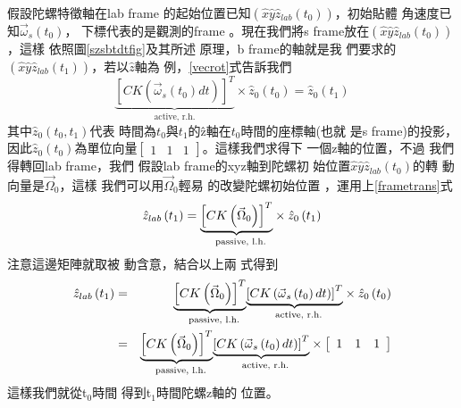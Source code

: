 \documentclass[12pt,a4paper]{article}
\begin{document}
假設陀螺特徵軸在lab frame%
的起始位置已知$\left( \hat{x}\hat{y%
}\hat{z}_{lab}(t_{0})\right) $，初始貼體%
角速度已知$\vec{\omega}_{s}(t_{0})$，%
下標代表的是觀測的frame%
。現在我們將s frame放在$%
\left( \hat{x}\hat{y}\hat{z}_{lab}(t_{0})\right) $，這樣%
依照圖\ref{szsbtdtfig}及其所述%
原理，b frame的軸就是我%
們要求的$\left( \hat{x}\hat{y}\hat{z}%
_{lab}(t_{1})\right) $，若以$\hat{z}$軸為%
例，\ref{vecrot}式告訴我們%
\begin{equation*}
\underset{\text{active, r.h.}}{\underbrace{\left[ CK\left( \vec{\omega}%
_{s}\left( t_{0}\right) dt\right) \right] ^{T}}}\times \hat{z}_{0}\left(
t_{0}\right) =\hat{z}_{0}\left( t_{1}\right) 
\end{equation*}%
其中$\hat{z}_{0}\left( t_{0},t_{1}\right) $代表%
時間為$t_{0}$與$t_{1}$的\^{z}軸在$%
t_{0}$時間的座標軸(也就%
是s frame)的投影，因此$\hat{z}%
_{0}\left( t_{0}\right) $為單位向量$\left[ 
\begin{array}{ccc}
1 & 1 & 1%
\end{array}%
\right] $。這樣我們求得下%
一個z軸的位置，不過%
我們得轉回lab frame，我們%
假設lab frame的xyz軸到陀螺初%
始位置$\hat{x}\hat{y}\hat{z}_{lab}(t_{0})$的轉%
動向量是$\vec{\Omega}_{0}， $這樣%
我們可以用$\vec{\Omega}_{0}$輕易%
的改變陀螺初始位置%
，運用上\ref{frametrans}式%
\begin{equation*}
\hat{z}_{lab}\left( t_{1}\right) =\underset{\text{passive, l.h.}}{%
\underbrace{\left[ CK\left( \vec{\Omega}_{0}\right) \right] ^{T}}}\times 
\hat{z}_{0}\left( t_{1}\right) 
\end{equation*}%
注意這邊矩陣就取被%
動含意，結合以上兩%
式得到%
\begin{eqnarray*}
\hat{z}_{lab}\left( t_{1}\right)  &=&\underset{\text{passive, l.h.}}{%
\underbrace{\left[ CK\left( \vec{\Omega}_{0}\right) \right] ^{T}}}\underset{%
\text{active, r.h.}}{\underbrace{\left[ CK\left( \vec{\omega}_{s}\left(
t_{0}\right) dt\right) \right] ^{T}}}\times \hat{z}_{0}\left( t_{0}\right) 
\\
&=&\underset{\text{passive, l.h.}}{\underbrace{\left[ CK\left( \vec{\Omega}%
_{0}\right) \right] ^{T}}}\underset{\text{active, r.h.}}{\underbrace{\left[
CK\left( \vec{\omega}_{s}\left( t_{0}\right) dt\right) \right] ^{T}}}\times %
\left[ 
\begin{array}{ccc}
1 & 1 & 1%
\end{array}%
\right] 
\end{eqnarray*}%
這樣我們就從t$_{0}$時間%
得到t$_{1}$時間陀螺z軸的%
位置。
\end{document}
